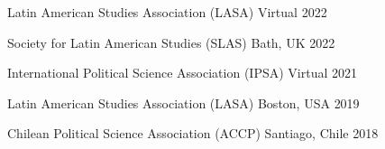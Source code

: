 





\hspace{2.25mm}{\footnotesize $^\star$ Selection only from the last five years}

\vspace{1mm}

\begin{cvhonors}
\cvconf
{Latin American Studies Association (LASA)} 
{Virtual}
{2022}
\end{cvhonors}

\begin{cvhonors}
\cvconf
{Society for Latin American Studies (SLAS)} 
{Bath, UK}
{2022}
\end{cvhonors}


\begin{cvhonors}
\cvconf
{International Political Science Association (IPSA)} 
{Virtual}
{2021}
\end{cvhonors}

\begin{cvhonors}
\cvconf
{Latin American Studies Association (LASA)} 
{Boston, USA}
{2019}
\end{cvhonors}

\begin{cvhonors}
\cvconf
{Chilean Political Science Association (ACCP)} 
{Santiago, Chile}
{2018}
\end{cvhonors}

